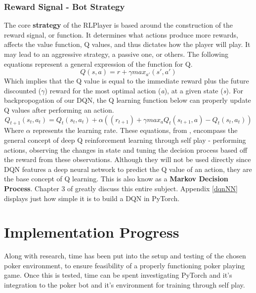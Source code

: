 \documentclass[12pt]{article}
\begin{document}
\subsubsection{Reward Signal - Bot Strategy}
The core \textbf{strategy} of the RLPlayer is based around the construction of the reward signal, or function. It determines what actions produce more rewards, affects the value function, Q values, and thus dictates how the player will play. It may lead to an aggressive strategy, a passive one, or others. The following equations represent a general expression of the function for Q.
\begin{equation}
	Q(s,a) = r + \gamma max_{a'} (s',a')
\end{equation}
Which implies that the Q value is equal to the immediate reward plus the future discounted ($\gamma$) reward for the most optimal action (\textit{a}), at a given state (\textit{s}). For backpropogation of our DQN, the Q learning function below can properly update Q values after performing an action. 
\begin{equation}
	Q_{t+1}(s_t , a_t) = Q_t(s_t,a_t) + \alpha ((r_{t+1}) + \gamma max_a Q_t(s_{t+1},a) - Q_t(s_t,a_t))
\end{equation}
Where $\alpha$ represents the learning rate. These equations, from \cite{q}, encompass the general concept of deep Q reinforcement learning through self play - performing actions, observing the changes in state and tuning the decision process based off the reward from these observations. Although they will not be used directly since DQN features a deep neural network to predict the Q value of an action, they are the base concept of Q learning. This is also know as a \textbf{Markov Decision Process}. Chapter 3 of \cite{rlref} greatly discuss this entire subject. Appendix \ref{dqnNN} displays just how simple it is to build a DQN in PyTorch.
\section{Implementation Progress}
Along with research, time has been put into the setup and testing of the chosen poker environment, to ensure feasibility of a properly functioning poker playing game. Once this is tested, time can be spent investigating PyTorch and it's integration to the poker bot and it's environment for training through self play.
\end{document}
